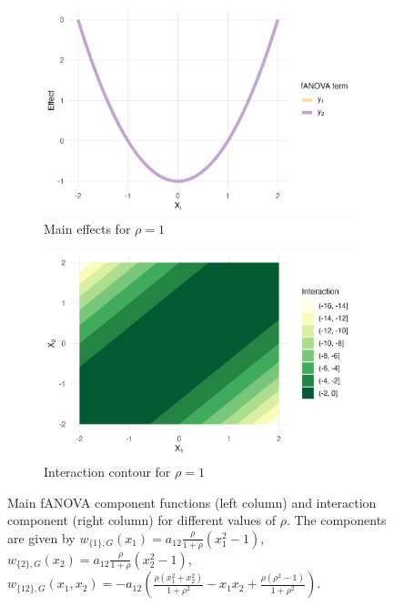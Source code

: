 \begin{figure}[htpb]
    \vspace{0.5em}
    \begin{subfigure}[t]{0.49\textwidth}
        \centering
        \includegraphics[width=\textwidth]{images/experiment_section/interaction_a1p00_a2p00_a11p00_a22p00_a12p20_rhop10_main.png}
        \caption{Main effects for $\rho = 1$}
    \end{subfigure}%
    \hfill
    \begin{subfigure}[t]{0.49\textwidth}
        \centering
        \includegraphics[width=\textwidth]{images/experiment_section/interaction_a1p00_a2p00_a11p00_a22p00_a12p20_rhop10_interaction.png}
        \caption{Interaction contour for $\rho = 1$}
    \end{subfigure}

    \caption{Main fANOVA component functions (left column) and interaction component (right column) for different values of $\rho$. The components are given by $w_{\{1\}, G}(x_1) = a_{12} \frac{\rho}{1+ \rho} (x_1^2 - 1)$,
    $w_{\{2\}, G}(x_2) = a_{12} \frac{\rho}{1+ \rho} (x_2^2 - 1)$,
    $w_{\{12\}, G}(x_1,x_2) = -a_{12}\!\left(\frac{\rho(x_1^2+x_2^2)}{1+\rho^2} - x_1 x_2 + \frac{\rho(\rho^2-1)}{1+\rho^2}\right)$.}
    \label{fig:interaction_combined}
\end{figure}

